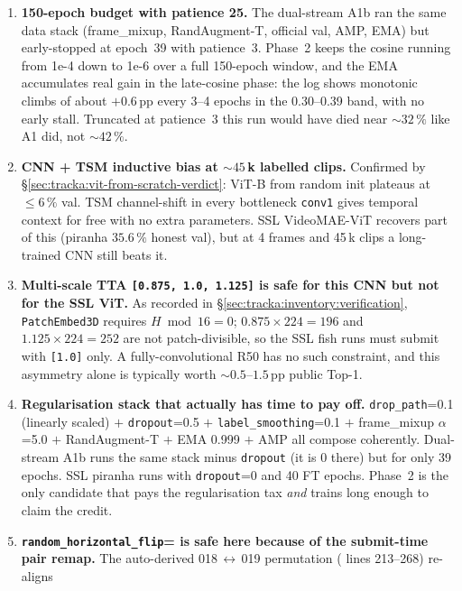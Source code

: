 \begin{enumerate}[leftmargin=*]
\item \textbf{150-epoch budget with patience 25.}  The dual-stream A1b
   ran the same data stack (frame\_mixup, RandAugment-T, official val,
   AMP, EMA) but early-stopped at epoch~39 with patience~3.  Phase~2
   keeps the cosine running from 1e-4 down to 1e-6 over a full
   150-epoch window, and the EMA accumulates real gain in the
   late-cosine phase: the log shows monotonic climbs of about
   \(+0.6\)\,pp every 3--4 epochs in the 0.30--0.39 band, with no early
   stall.  Truncated at patience~3 this run would have died near
   \(\sim 32\,\%\) like A1 did, not \(\sim 42\,\%\).
\item \textbf{CNN + TSM inductive bias at \(\sim 45\,\)k labelled clips.}
   Confirmed by \S\ref{sec:tracka:vit-from-scratch-verdict}: ViT-B from
   random init plateaus at \(\le 6\,\%\) val.  TSM channel-shift in
   every bottleneck \texttt{conv1} gives temporal context for free with
   no extra parameters.  SSL VideoMAE-ViT recovers part of this
   (piranha \(35.6\,\%\) honest val), but at 4 frames and 45\,k clips a
   long-trained CNN still beats it.
\item \textbf{Multi-scale TTA \texttt{[0.875, 1.0, 1.125]} is safe for
   this CNN but not for the SSL ViT.}  As recorded in
   \S\ref{sec:tracka:inventory:verification}, \texttt{PatchEmbed3D}
   requires \(H \bmod 16 = 0\); \(0.875 \times 224 = 196\) and \(1.125
   \times 224 = 252\) are not patch-divisible, so the SSL fish runs
   must submit with \texttt{[1.0]} only.  A fully-convolutional R50 has
   no such constraint, and this asymmetry alone is typically worth
   \(\sim 0.5\)--\(1.5\,\)pp public Top-1.
\item \textbf{Regularisation stack that actually has time to pay off.}
   \texttt{drop\_path}=0.1 (linearly scaled) \(+\) \texttt{dropout}=0.5
   \(+\) \texttt{label\_smoothing}=0.1 \(+\) frame\_mixup \(\alpha\)=5.0
   \(+\) RandAugment-T \(+\) EMA 0.999 \(+\) AMP all compose
   coherently.  Dual-stream A1b runs the same stack minus
   \texttt{dropout} (it is 0 there) but for only 39 epochs.  SSL piranha
   runs with \texttt{dropout}=0 and 40 FT epochs.  Phase~2 is the only
   candidate that pays the regularisation tax \emph{and} trains long
   enough to claim the credit.
\item \textbf{\texttt{random\_horizontal\_flip}= is safe here
   because of the submit-time pair remap.}  The auto-derived 018\,\(\leftrightarrow\)\,019
   permutation
   ( lines 213--268) re-aligns

\end{enumerate}
